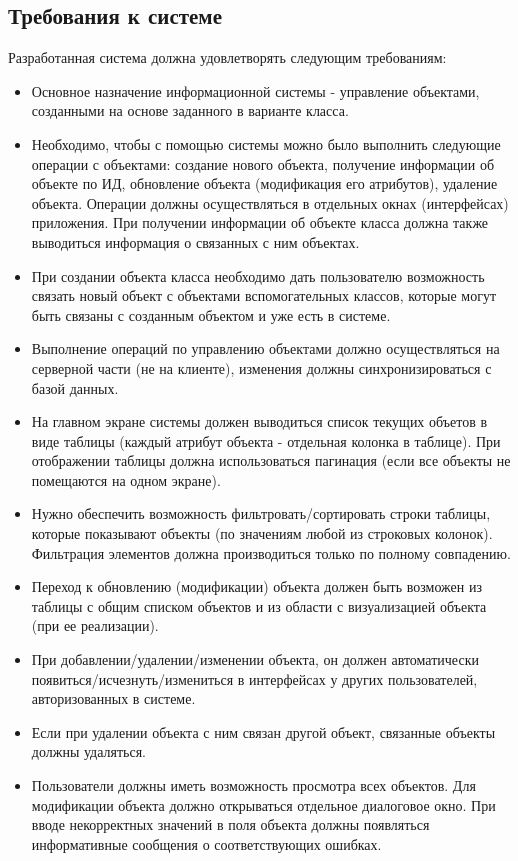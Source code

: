 \subsection{Требования к системе}

Разработанная система должна удовлетворять следующим требованиям:

\begin{itemize}
\item Основное назначение информационной системы - управление объектами, созданными на основе заданного в варианте класса.
\item Необходимо, чтобы с помощью системы можно было выполнить следующие операции с объектами: создание нового объекта, получение информации об объекте по ИД, обновление объекта (модификация его атрибутов), удаление объекта. Операции должны осуществляться в отдельных окнах (интерфейсах) приложения. При получении информации об объекте класса должна также выводиться информация о связанных с ним объектах.
\item При создании объекта класса необходимо дать пользователю возможность связать новый объект с объектами вспомогательных классов, которые могут быть связаны с созданным объектом и уже есть в системе.
\item Выполнение операций по управлению объектами должно осуществляться на серверной части (не на клиенте), изменения должны синхронизироваться с базой данных.
\item На главном экране системы должен выводиться список текущих объетов в виде таблицы (каждый атрибут объекта - отдельная колонка в таблице). При отображении таблицы должна использоваться пагинация (если все объекты не помещаются на одном экране).
\item Нужно обеспечить возможность фильтровать/сортировать строки таблицы, которые показывают объекты (по значениям любой из строковых колонок). Фильтрация элементов должна производиться только по полному совпадению.
\item Переход к обновлению (модификации) объекта должен быть возможен из таблицы с общим списком объектов и из области с визуализацией объекта (при ее реализации).
\item При добавлении/удалении/изменении объекта, он должен автоматически появиться/исчезнуть/измениться в интерфейсах у других пользователей, авторизованных в системе.
\item Если при удалении объекта с ним связан другой объект, связанные объекты должны удаляться.
\item Пользователи должны иметь возможность просмотра всех объектов. Для модификации объекта должно открываться отдельное диалоговое окно. При вводе некорректных значений в поля объекта должны появляться информативные сообщения о соответствующих ошибках.
\end{itemize}


